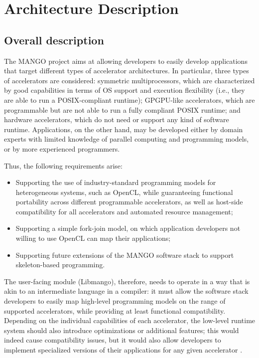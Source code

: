 \chapter{Architecture Description}

\section{Overall description}

The MANGO project aims at allowing developers to easily develop applications that target different types of accelerator architectures. In particular,  three types of accelerators are considered: symmetric multiprocessors, which are characterized by good capabilities in terms of OS support and execution flexibility (i.e., they are able to run a POSIX-compliant runtime); GPGPU-like accelerators, which are programmable but are not able to run a fully compliant POSIX runtime; and hardware accelerators, which do not need or support any kind  of software runtime. Applications, on the other hand, may be developed either by domain experts with limited knowledge of parallel computing and programming models, or by more experienced programmers. 

Thus, the following requirements arise:
\begin{itemize}
    \item 
    Supporting the use of industry-standard programming models for heterogeneous systems, such as OpenCL, while guaranteeing functional portability across different programmable accelerators, as well as host-side compatibility for all accelerators and automated resource management;
    \item 
    Supporting a simple fork-join model, on which application developers not willing to use OpenCL can map their applications;
    \item
    Supporting future extensions of the MANGO software stack to support skeleton-based programming.
\end{itemize}

The user-facing module (Libmango), therefore, needs to operate in a way that is akin to an intermediate language in a compiler: it must allow the software stack developers to easily map high-level programming models on the range of supported accelerators, while providing at least functional compatibility. Depending on the individual capabilities of each accelerator, the low-level runtime system should also introduce optimizations or additional features; this would indeed cause compatibility issues, but it would also allow developers to implement specialized versions of their applications for any given accelerator \cite{mango_exploring_manycore_architectures}. 

